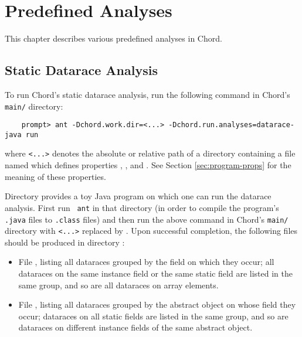 \chapter{Predefined Analyses}
\label{chap:predefined-analyses}

This chapter describes various predefined analyses in Chord.

\section{Static Datarace Analysis}

To run Chord's static datarace analysis, run the following
command in Chord's {\tt main/} directory:

\begin{verbatim}
    prompt> ant -Dchord.work.dir=<...> -Dchord.run.analyses=datarace-java run
\end{verbatim}

where {\tt <...>} denotes the absolute or relative path of a directory
containing a file named  which defines
properties , , and
.  See Section \ref{sec:program-props} for the
meaning of these properties.

Directory  provides a toy Java
program on which one can run the datarace analysis.  First run {\tt
  ant} in that directory (in order to compile the program's {\tt
  .java} files to {\tt .class} files) and then run the above command
in Chord's {\tt main/} directory with {\tt <...>} replaced by
.  Upon successful completion, the
following files should be produced in directory
:

\begin{itemize}
\item
File , listing all dataraces grouped by
the field on which they occur; all dataraces on the same instance
field or the same static field are listed in the same group, and so
are all dataraces on array elements.
\item
File , listing all dataraces grouped by
the abstract object on whose field they occur; dataraces on all static
fields are listed in the same group, and so are dataraces on different
instance fields of the same abstract object.
\end{itemize}

